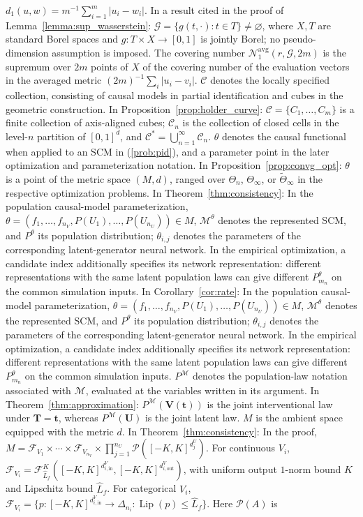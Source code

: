 \documentclass[12pt]{article}
\theoremstyle{plain}
\theoremstyle{definition}
\theoremstyle{remark}
\begin{document}
$d_1(u,w)=m^{-1}\sum_{i=1}^m|u_i-w_i|$. In a result cited in the proof of Lemma~\ref{lemma:sup_wasserstein}: $\mathcal G=\{g(t,\cdot):t\in T\}\ne\varnothing$, where $X,T$ are standard Borel spaces and $g:T\times X\rightarrow[0,1]$ is jointly Borel; no pseudo-dimension assumption is imposed. The covering number $\mathcal N_1^{\mathrm{avg}}(r,\mathcal G,2m)$ is the supremum over $2m$ points of $X$ of the covering number of the evaluation vectors in the averaged metric $(2m)^{-1}\sum_i|u_i-v_i|$. $\mathcal{C}$ denotes the locally specified collection, consisting of causal models in partial identification and cubes in the geometric construction. In Proposition~\ref{prop:holder_curve}: $\mathcal{C}=\{C_1,\ldots,C_m\}$ is a finite collection of axis-aligned cubes; $\mathcal{C}_n$ is the collection of closed cells in the level-$n$ partition of $[0,1]^d$, and $\mathcal{C}^{*}=\bigcup_{n=1}^{\infty}\mathcal{C}_n$. $\theta$ denotes the causal functional when applied to an SCM in (\ref{prob:pid}), and a parameter point in the later optimization and parameterization notation. In Proposition~\ref{prop:convg_opt}: $\theta$ is a point of the metric space $(M,d)$, ranged over $\Theta_n$, $\Theta_\infty$, or $\tilde{\Theta}_\infty$ in the respective optimization problems. In Theorem~\ref{thm:consistency}: In the population causal-model parameterization, $\theta=(f_1,\ldots,f_{n_V},P(U_1),\ldots,P(U_{n_U}))\in M$, $\mathcal{M}^{\theta}$ denotes the represented SCM, and $P^{\theta}$ its population distribution; $\theta_{i,j}$ denotes the parameters of the corresponding latent-generator neural network. In the empirical optimization, a candidate index additionally specifies its network representation: different representations with the same latent population laws can give different $P_{m_n}^{\theta}$ on the common simulation inputs. In Corollary~\ref{cor:rate}: In the population causal-model parameterization, $\theta=(f_1,\ldots,f_{n_V},P(U_1),\ldots,P(U_{n_U}))\in M$, $\mathcal{M}^{\theta}$ denotes the represented SCM, and $P^{\theta}$ its population distribution; $\theta_{i,j}$ denotes the parameters of the corresponding latent-generator neural network. In the empirical optimization, a candidate index additionally specifies its network representation: different representations with the same latent population laws can give different $P_{m_n}^{\theta}$ on the common simulation inputs. $P^{\mathcal{M}}$ denotes the population-law notation associated with $\mathcal{M}$, evaluated at the variables written in its argument. In Theorem~\ref{thm:approximation}: $P^{\mathcal{M}}(\boldsymbol{V}(\boldsymbol{t}))$ is the joint interventional law under $\boldsymbol{T}=\boldsymbol{t}$, whereas $P^{\mathcal{M}}(\boldsymbol{U})$ is the joint latent law. $M$ is the ambient space equipped with the metric $d$. In Theorem~\ref{thm:consistency}: In the proof, $M=\mathcal F_{V_1}\times\cdots\times\mathcal F_{V_{n_V}}\times\prod_{j=1}^{n_U}\mathcal P([-K,K]^{d_j^U})$. For continuous $V_i$, $\mathcal F_{V_i}=\mathcal F_{\hat L_f}^K([-K,K]^{d_{i,\text{in}}^V},[-K,K]^{d_{i,\text{out}}^V})$, with uniform output $1$-norm bound $K$ and Lipschitz bound $\hat L_f$. For categorical $V_i$, $\mathcal F_{V_i}=\{p:[-K,K]^{d_{i,\text{in}}^V}\rightarrow\Delta_{n_i}:\operatorname{Lip}(p)\leqslant\hat L_f\}$. Here $\mathcal P(A)$ is 
\end{document}
